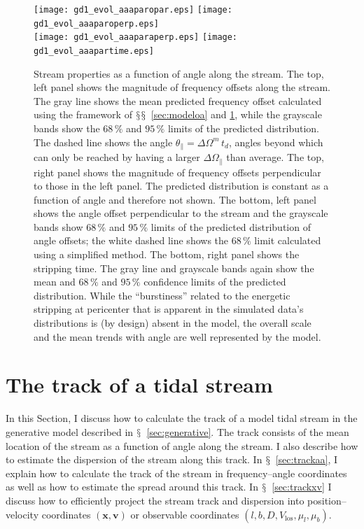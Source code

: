 \documentclass{emulateapj}
\newcommand{\sectionname}{$\mathsection$}
\renewcommand{\vec}[1]{\ensuremath{\mathbf{#1}}}
\newcommand{\vecx}{\ensuremath{\vec{x}}}
\newcommand{\vecv}{\ensuremath{\vec{v}}}
\newcommand{\apar}{\ensuremath{\theta_\parallel}}
\newcommand{\opar}{\ensuremath{\Omega_\parallel}}
\newcommand{\vlos}{\ensuremath{V_{\mathrm{los}}}}
\newcommand{\pmll}{\ensuremath{\mu_l}}
\newcommand{\pmbb}{\ensuremath{\mu_b}}
\begin{document}
\begin{figure}[t!]
\begin{center}
  \texttt{[image: gd1\_evol\_aaaparopar.eps]}
  \texttt{[image: gd1\_evol\_aaaparoperp.eps]}\\
  \texttt{[image: gd1\_evol\_aaaparaperp.eps]}
  \texttt{[image: gd1\_evol\_aaapartime.eps]}
  \caption{Stream properties as a function of angle along the
    stream. The top, left panel shows the magnitude of frequency
    offsets along the stream. The gray line shows the mean predicted
    frequency offset calculated using the framework of
    \sectionname\sectionname~\ref{sec:modeloa} and \ref{sec:track},
    while the grayscale bands show the $68\,\%$ and $95\,\%$ limits of
    the predicted distribution. The dashed line shows the angle $\apar
    = \Delta \Omega^m\,t_d$, angles beyond which can only be reached
    by having a larger $\Delta \opar$ than average. The top, right
    panel shows the magnitude of frequency offsets perpendicular to
    those in the left panel. The predicted distribution is constant as
    a function of angle and therefore not shown. The bottom, left
    panel shows the angle offset perpendicular to the stream and the
    grayscale bands show $68\,\%$ and $95\,\%$ limits of the predicted
    distribution of angle offsets; the white dashed line shows the
    $68\,\%$ limit calculated using a simplified method. The bottom,
    right panel shows the stripping time. The gray line and grayscale
    bands again show the mean and $68\,\%$ and $95\,\%$ confidence
    limits of the predicted distribution. While the ``burstiness''
    related to the energetic stripping at pericenter that is apparent
    in the simulated data's distributions is (by design) absent in the
    model, the overall scale and the mean trends with angle are well
    represented by the model.}\label{fig:gd1_apar}
\end{center}
\end{figure}

\section{The track of a tidal stream}\label{sec:track}

In this Section, I discuss how to calculate the track of a model tidal
stream in the generative model described in
\sectionname~\ref{sec:generative}. The track consists of the mean
location of the stream as a function of angle along the stream. I also
describe how to estimate the dispersion of the stream along this
track. In \sectionname~\ref{sec:trackaa}, I explain how to calculate
the track of the stream in frequency--angle coordinates as well as how
to estimate the spread around this track. In
\sectionname~\ref{sec:trackxv} I discuss how to efficiently project
the stream track and dispersion into position--velocity coordinates
$(\vecx,\vecv)$ or observable coordinates $(l,b,D,\vlos,\pmll,\pmbb)$.
\end{document}
